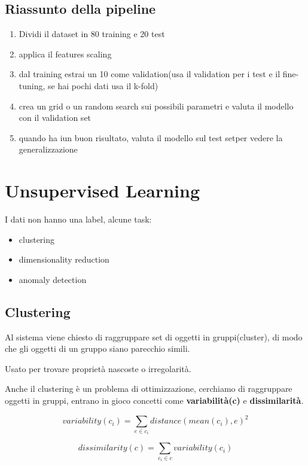 \subsection{Riassunto della pipeline}
\begin{enumerate}
    \item Dividi il dataset in 80 training e 20 test
    \item applica il features scaling
    \item dal training estrai un 10 come validation(usa il validation per i test e il fine-tuning, se hai pochi dati usa il k-fold)
    \item crea un grid o un random search sui possibili parametri e valuta il modello con il validation set
    \item quando ha iun buon risultato, valuta il modello sul test setper vedere la generalizzazione
\end{enumerate}

\section{Unsupervised Learning}

I dati non hanno una label,
alcune task:
\begin{itemize}
    \item clustering
    \item dimensionality reduction
    \item anomaly detection
\end{itemize}

\subsection{Clustering}
Al sistema viene chiesto di raggruppare set di oggetti in gruppi(cluster), di modo
che gli oggetti di un gruppo siano parecchio simili.

Usato per trovare proprietà nascoste o irregolarità.

Anche il clustering è un problema di ottimizzazione, cerchiamo di raggruppare oggetti
in gruppi, entrano in gioco concetti come \textbf{variabilità(c)} e \textbf{dissimilarità}.

\begin{equation}
    variability(c_i) = \sum_{e\in c_i} distance(mean(c_i), e) ^2
\end{equation}

\begin{equation}
    dissimilarity(c) = \sum_{c_i\in c} variability(c_i)
\end{equation}

